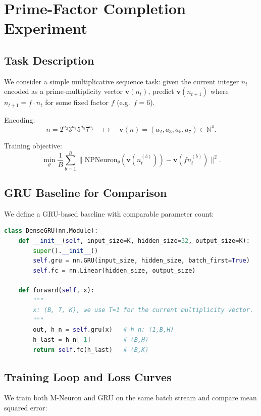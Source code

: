 \documentclass[11pt]{article}
\begin{document}
\section{Prime-Factor Completion Experiment}

\subsection{Task Description}

We consider a simple multiplicative sequence task: given the current integer \(n_t\) encoded as a prime-multiplicity vector \(\mathbf{v}(n_t)\), predict \(\mathbf{v}(n_{t+1})\) where \(n_{t+1} = f \cdot n_t\) for some fixed factor \(f\) (e.g.\ \(f=6\)).

Encoding:
\[
n = 2^{a_2} 3^{a_3} 5^{a_5} 7^{a_7}
\quad\longmapsto\quad
\mathbf{v}(n) = (a_2,a_3,a_5,a_7) \in \mathbb{N}^4.
\]

Training objective:
\[
\min_\theta \frac{1}{B}\sum_{b=1}^B
\| \mathrm{NPNeuron}_\theta(\mathbf{v}(n_t^{(b)})) - \mathbf{v}(f n_t^{(b)})\|^2.
\]

\subsection{GRU Baseline for Comparison}

We define a GRU-based baseline with comparable parameter count:

\begin{lstlisting}[language=Python,caption={GRU baseline model}]
class DenseGRU(nn.Module):
    def __init__(self, input_size=K, hidden_size=32, output_size=K):
        super().__init__()
        self.gru = nn.GRU(input_size, hidden_size, batch_first=True)
        self.fc = nn.Linear(hidden_size, output_size)

    def forward(self, x):
        """
        x: (B, T, K), we use T=1 for the current multiplicity vector.
        """
        out, h_n = self.gru(x)   # h_n: (1,B,H)
        h_last = h_n[-1]         # (B,H)
        return self.fc(h_last)   # (B,K)
\end{lstlisting}

\subsection{Training Loop and Loss Curves}

We train both M-Neuron and GRU on the same batch stream and compare mean squared error:
\end{document}
